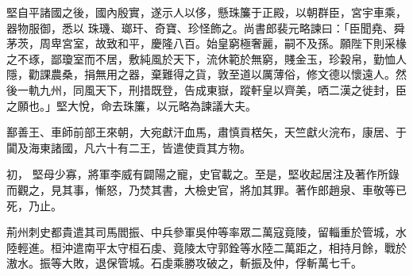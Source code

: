 \begin{pinyinscope}
 堅自平諸國之後，國內殷實，遂示人以侈，懸珠簾于正殿，以朝群臣，宮宇車乘，器物服御，悉以
 珠璣、瑯玕、奇寶、珍怪飾之。尚書郎裴元略諫曰：「臣聞堯、舜茅茨，周卑宮室，故致和平，慶隆八百。始皇窮極奢麗，嗣不及孫。願陛下則采椽之不琢，鄙瓊室而不居，敷純風於天下，流休範於無窮，賤金玉，珍穀帛，勤恤人隱，勸課農桑，捐無用之器，棄難得之貨，敦至道以厲薄俗，修文德以懷遠人。然後一軌九州，同風天下，刑措既登，告成東嶽，蹤軒皇以齊美，哂二漢之徙封，臣之願也。」堅大悅，命去珠簾，以元略為諫議大夫。



 鄯善王、車師前部王來朝，大宛獻汗血馬，肅慎貢楛矢，天竺獻火浣布，康居、于闐及海東諸國，凡六十有二王，皆遣使貢其方物。



 初，
 堅母少寡，將軍李威有闢陽之寵，史官載之。至是，堅收起居注及著作所錄而觀之，見其事，慚怒，乃焚其書，大檢史官，將加其罪。著作郎趙泉、車敬等已死，乃止。



 荊州刺史都貴遣其司馬閻振、中兵參軍吳仲等率眾二萬寇竟陵，留輜重於管城，水陸輕進。桓沖遣南平太守桓石虔、竟陵太守郭銓等水陸二萬距之，相持月餘，戰於滶水。振等大敗，退保管城。石虔乘勝攻破之，斬振及仲，俘斬萬七千。



\end{pinyinscope}